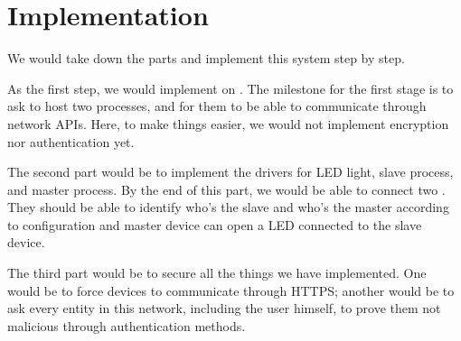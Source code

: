 \section{Implementation}

We would take down the parts and implement this system step by step.

As the first step, we would implement \ritos on \rpi. 
The milestone for the first stage is to ask \ritos to host two processes, and for them to be able to communicate through network APIs.
Here, to make things easier, we would not implement encryption nor authentication yet.

The second part would be to implement the drivers for LED light, slave process, and master process.
By the end of this part, we would be able to connect two \rpis. 
They should be able to identify who's the slave and who's the master according to configuration and master device can open a LED  connected to the slave device.

The third part would be to secure all the things we have implemented.
One would be to force devices to communicate through HTTPS; another would be to ask every entity in this network, including the user himself, to prove them not malicious through authentication methods.
